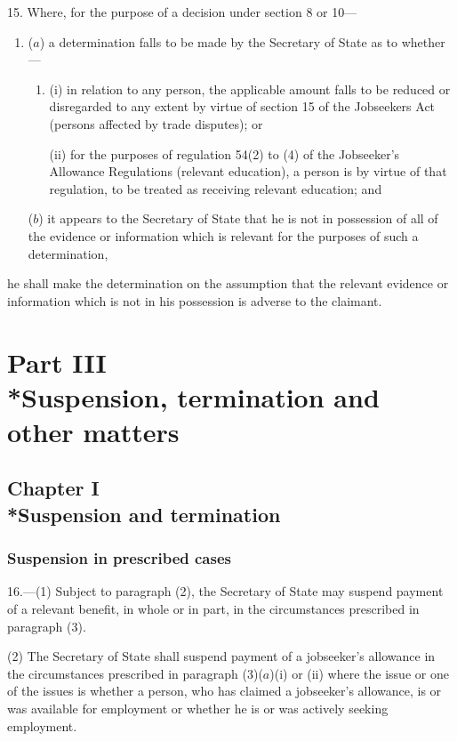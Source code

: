 \documentclass[12pt,a4paper]{article}
\begin{document}
15.  Where, for the purpose of a decision under section 8 or 10—
\begin{enumerate}\item[]
($a$) a determination falls to be made by the Secretary of State as to whether—
\begin{enumerate}\item[]
(i) in relation to any person, the applicable amount falls to be reduced or disregarded to any extent by virtue of section 15 of the Jobseekers Act (persons affected by trade disputes); or

(ii) for the purposes of regulation 54(2) to (4) of the Jobseeker’s Allowance Regulations (relevant education), a person is by virtue of that regulation, to be treated as receiving relevant education; and
\end{enumerate}

($b$) it appears to the Secretary of State that he is not in possession of all of the evidence or information which is relevant for the purposes of such a determination,
\end{enumerate}
he shall make the determination on the assumption that the relevant evidence or information which is not in his possession is adverse to the claimant.

\section[Part III --- Suspension, termination and other matters]{Part III\\*Suspension, termination and other matters}

\subsection[Chapter I --- Suspension and termination]{Chapter I\\*Suspension and termination}

\subsubsection[16. Suspension in prescribed cases]{Suspension in prescribed cases}

\renewcommand\parthead{--- Part III Chapter I}

16.—(1) Subject to paragraph (2), the Secretary of State may suspend payment of a relevant benefit, in whole or in part, in the circumstances prescribed in paragraph (3).

(2) The Secretary of State shall suspend payment of a jobseeker’s allowance in the circumstances prescribed in paragraph (3)($a$)(i) or (ii) where the issue or one of the issues is whether a person, who has claimed a jobseeker’s allowance, is or was available for employment or whether he is or was actively seeking employment.
\end{document}
